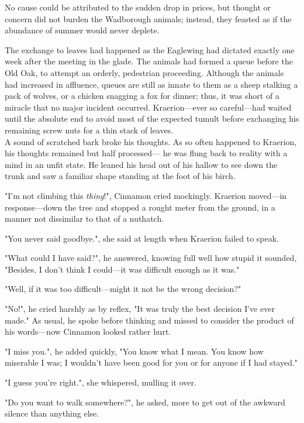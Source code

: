 No cause could be attributed to the sudden drop in prices, but thought or concern did not burden the Wadborough animals; instead, they feasted as if the abundance of summer would never deplete.%

The exchange to leaves had happened as the Eaglewing had dictated exactly one week after the meeting in the glade. The animals had formed a queue before the Old Oak, to attempt an orderly, pedestrian proceeding. Although the animals had increased in affluence, queues are still as innate to them as a sheep stalking a pack of wolves, or a chicken snagging a fox for dinner; thus, it was short of a miracle that no major incident occurred. Kraerion---ever so careful---had waited until the absolute end to avoid most of the expected tumult before exchanging his remaining screw nuts for a thin stack of leaves.\\

A sound of scratched bark broke his thoughts. As so often happened to Kraerion, his thoughts remained but half processed--- he was flung back to reality with a mind in an unfit state. He leaned his head out of his hallow to see down the trunk and saw a familiar shape standing at the foot of his birch.

"I'm not climbing this \textit{thing}!", Cinnamon cried mockingly. Kraerion moved---in response---down the tree and stopped a rought meter from the ground, in a manner not dissimilar to that of a nuthatch.

"You never said goodbye.", she said at length when Kraerion failed to speak.

"What could I have said?", he answered, knowing full well how stupid it sounded, "Besides, I don't think I could---it was difficult enough as it was."

"Well, if it was too difficult---might it not be the wrong decision?"

"No!", he cried harshly as by reflex, "It was truly the best decision I've ever made."
As usual, he spoke before thinking and missed to consider the product of his words---now Cinnamon looked rather hurt. 

"I miss you.", he added quickly, "You know what I mean. You know how miserable I was; I wouldn't have been good for you or for anyone if I had stayed."

"I guess you're right.", she whispered, mulling it over.

"Do you want to walk somewhere?", he asked, more to get out of the awkward silence than anything else.

